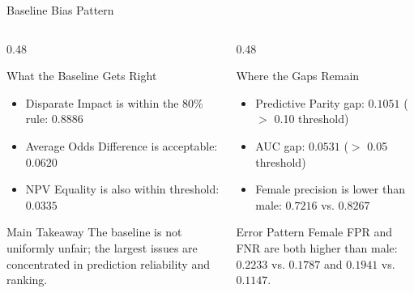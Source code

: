 \documentclass[10pt,aspectratio=169]{beamer}
\begin{document}
\begin{frame}{Baseline Bias Pattern}
  \begin{columns}[T,onlytextwidth]
    \begin{column}{0.48\textwidth}
      \begin{block}{What the Baseline Gets Right}
        \begin{itemize}
          \item Disparate Impact is within the 80\% rule: $0.8886$
          \item Average Odds Difference is acceptable: $0.0620$
          \item NPV Equality is also within threshold: $0.0335$
        \end{itemize}
      \end{block}

      \begin{alertblock}{Main Takeaway}
        The baseline is not uniformly unfair; the largest issues are concentrated in prediction reliability and ranking.
      \end{alertblock}
    \end{column}
    \begin{column}{0.48\textwidth}
      \begin{block}{Where the Gaps Remain}
        \begin{itemize}
          \item Predictive Parity gap: $0.1051$ \;($>$ 0.10 threshold)
          \item AUC gap: $0.0531$ \;($>$ 0.05 threshold)
          \item Female precision is lower than male: $0.7216$ vs. $0.8267$
        \end{itemize}
      \end{block}

      \begin{exampleblock}{Error Pattern}
        Female FPR and FNR are both higher than male: $0.2233$ vs. $0.1787$ and $0.1941$ vs. $0.1147$.
      \end{exampleblock}
    \end{column}
  \end{columns}

  \vspace{0.3em}
  \begin{center}
  \end{center}
\end{frame}
\end{document}

